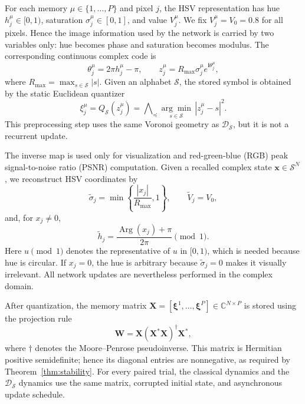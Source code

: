 \documentclass[10pt,journal,letterpaper]{IEEEtran}
\begin{document}
For each memory $\mu\in\{1,\ldots,P\}$ and pixel $j$, the HSV representation
has hue $h_j^{\mu}\in[0,1)$, saturation $\sigma_j^{\mu}\in[0,1]$, and value
$V_j^{\mu}$. We fix $V_j^{\mu}=V_0=0.8$ for all pixels. Hence the image
information used by the network is carried by two variables only: hue becomes
phase and saturation becomes modulus. The corresponding continuous complex code
is
\begin{equation}
    \theta_j^{\mu}=2\pi h_j^{\mu}-\pi,
    \qquad
    z_j^{\mu}=R_{\max}\sigma_j^{\mu}e^{\mathbf{i}\theta_j^{\mu}},
\label{eq:hsv_to_complex}
\end{equation}
where $R_{\max}=\max_{s\in\mathcal{S}}|s|$. Given an alphabet
$\mathcal{S}$, the stored symbol is obtained by the static Euclidean quantizer
\begin{equation}
    \xi_j^{\mu}
    =
    Q_{\mathcal{S}}(z_j^{\mu})
    =
    \mathop{\bigwedge}\nolimits_{\preceq}
    \underset{s\in\mathcal{S}}{\arg\min}\, |z_j^{\mu}-s|^2.
\label{eq:hsv_quantization}
\end{equation}
This preprocessing step uses the same Voronoi geometry as
$\mathcal{D}_{\mathcal{S}}$, but it is not a recurrent update.

The inverse map is used only for visualization and red-green-blue (RGB) peak signal-to-noise ratio (PSNR) computation. Given
a recalled complex state $\boldsymbol{x}\in\mathcal{S}^N$, we reconstruct HSV
coordinates by
\begin{equation}
    \widetilde{\sigma}_j
    =
    \min\left\{\frac{|x_j|}{R_{\max}},1\right\},
    \qquad
    \widetilde{V}_j=V_0,
\end{equation}
and, for $x_j\neq0$,
\begin{equation}
    \widetilde{h}_j
    =
    \frac{\operatorname{Arg}(x_j)+\pi}{2\pi}
    \pmod{1}.
\label{eq:complex_to_hsv}
\end{equation}
Here $u\pmod{1}$ denotes the representative of $u$ in $[0,1)$, which is needed
because hue is circular. If $x_j=0$, the hue is arbitrary because
$\widetilde{\sigma}_j=0$ makes it visually irrelevant. All network updates are
nevertheless performed in the complex domain.

After quantization, the memory matrix
$\boldsymbol{X}=[\boldsymbol{\xi}^1,\ldots,\boldsymbol{\xi}^P]\in\mathbb{C}^{N\times P}$
is stored using the projection rule
\begin{equation}
    \boldsymbol{W}
    =
    \boldsymbol{X}(\boldsymbol{X}^*\boldsymbol{X})^{\dagger}\boldsymbol{X}^*,
\label{eq:projection_storage}
\end{equation}
where $\dagger$ denotes the Moore--Penrose pseudoinverse. This matrix is
Hermitian positive semidefinite; hence its diagonal entries are nonnegative,
as required by Theorem~\ref{thm:stability}. For every paired trial, the
classical dynamics and the $\mathcal{D}_{\mathcal{S}}$ dynamics use the same
matrix, corrupted initial state, and asynchronous update schedule.
\end{document}
